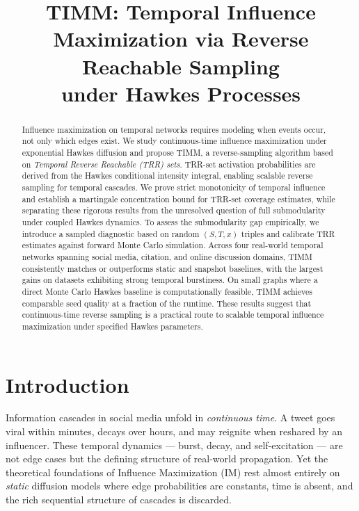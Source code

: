 \documentclass[10pt,conference]{IEEEtran}
\newcommand{\tiimm}{TIMM\xspace}
\begin{document}
\title{TIMM: Temporal Influence Maximization via Reverse Reachable Sampling\\ under Hawkes Processes}

\author{}

\maketitle

\begin{abstract}
Influence maximization on temporal networks requires modeling when events occur, not only which edges exist.
We study continuous-time influence maximization under exponential Hawkes diffusion and propose \tiimm{}, a reverse-sampling algorithm based on \emph{Temporal Reverse Reachable (TRR) sets}.
TRR-set activation probabilities are derived from the Hawkes conditional intensity integral, enabling scalable reverse sampling for temporal cascades.
We prove strict monotonicity of temporal influence and establish a martingale concentration bound for TRR-set coverage estimates, while separating these rigorous results from the unresolved question of full submodularity under coupled Hawkes dynamics.
To assess the submodularity gap empirically, we introduce a sampled diagnostic based on random $(S,T,x)$ triples and calibrate TRR estimates against forward Monte Carlo simulation.
Across four real-world temporal networks spanning social media, citation, and online discussion domains, \tiimm{} consistently matches or outperforms static and snapshot baselines, with the largest gains on datasets exhibiting strong temporal burstiness.
On small graphs where a direct Monte Carlo Hawkes baseline is computationally feasible, \tiimm{} achieves comparable seed quality at a fraction of the runtime.
These results suggest that continuous-time reverse sampling is a practical route to scalable temporal influence maximization under specified Hawkes parameters.
\end{abstract}

\section{Introduction}

Information cascades in social media unfold in \emph{continuous time}.
A tweet goes viral within minutes, decays over hours, and may reignite when reshared by an influencer.
These temporal dynamics — burst, decay, and self-excitation — are not edge cases but the defining structure of real-world propagation.
Yet the theoretical foundations of Influence Maximization (IM) rest almost entirely on \emph{static} diffusion models where edge probabilities are constants, time is absent, and the rich sequential structure of cascades is discarded.
\end{document}
